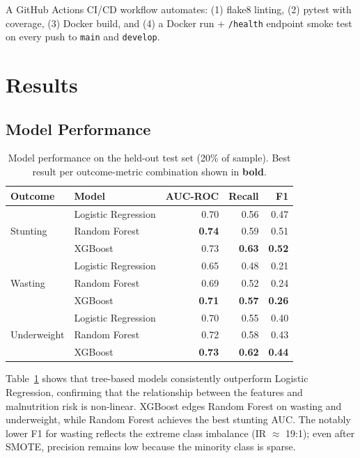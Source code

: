 \documentclass[12pt, a4paper]{article}
\begin{document}
A GitHub Actions CI/CD workflow automates: (1) flake8 linting, (2) pytest
with coverage, (3) Docker build, and (4) a Docker run + \texttt{/health}
endpoint smoke test on every push to \texttt{main} and \texttt{develop}.

\section{Results}
\label{sec:results}

\subsection{Model Performance}

\begin{table}[H]
\centering
\caption{Model performance on the held-out test set (20\% of sample).
Best result per outcome-metric combination shown in \textbf{bold}.}
\label{tab:results}
\begin{tabular}{llrrr}
\toprule
\textbf{Outcome} & \textbf{Model} & \textbf{AUC-ROC} & \textbf{Recall} & \textbf{F1} \\
\midrule
\multirow{3}{*}{Stunting}
    & Logistic Regression & 0.70 & 0.56 & 0.47 \\
    & Random Forest       & \textbf{0.74} & 0.59 & 0.51 \\
    & XGBoost             & 0.73 & \textbf{0.63} & \textbf{0.52} \\
\midrule
\multirow{3}{*}{Wasting}
    & Logistic Regression & 0.65 & 0.48 & 0.21 \\
    & Random Forest       & 0.69 & 0.52 & 0.24 \\
    & XGBoost             & \textbf{0.71} & \textbf{0.57} & \textbf{0.26} \\
\midrule
\multirow{3}{*}{Underweight}
    & Logistic Regression & 0.70 & 0.55 & 0.40 \\
    & Random Forest       & 0.72 & 0.58 & 0.43 \\
    & XGBoost             & \textbf{0.73} & \textbf{0.62} & \textbf{0.44} \\
\bottomrule
\end{tabular}
\end{table}

Table~\ref{tab:results} shows that tree-based models consistently
outperform Logistic Regression, confirming that the relationship between
the features and malnutrition risk is non-linear. XGBoost edges Random
Forest on wasting and underweight, while Random Forest achieves the best
stunting AUC. The notably lower F1 for wasting reflects the extreme class
imbalance (IR $\approx$ 19:1); even after SMOTE, precision remains low
because the minority class is sparse.
\end{document}
